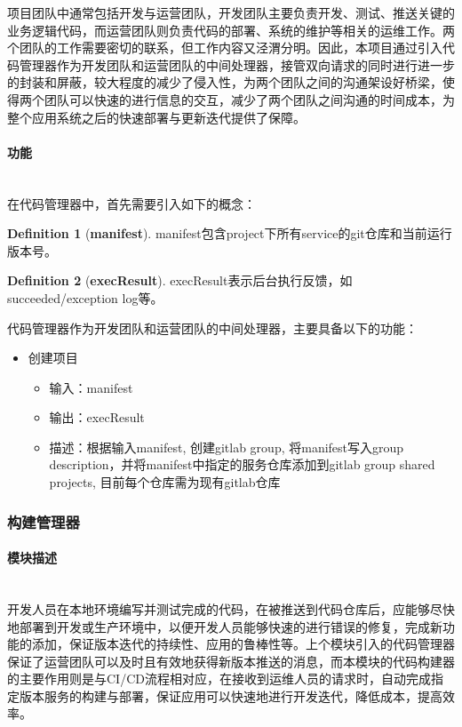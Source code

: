 \documentclass[a4paper]{article}
\theoremstyle{definition}
\newtheorem{definition}{Definition}[section]
\begin{document}
项目团队中通常包括开发与运营团队，开发团队主要负责开发、测试、推送关键的业务逻辑代码，而运营团队则负责代码的部署、系统的维护等相关的运维工作。两个团队的工作需要密切的联系，但工作内容又泾渭分明。因此，本项目通过引入代码管理器作为开发团队和运营团队的中间处理器，接管双向请求的同时进行进一步的封装和屏蔽，较大程度的减少了侵入性，为两个团队之间的沟通架设好桥梁，使得两个团队可以快速的进行信息的交互，减少了两个团队之间沟通的时间成本，为整个应用系统之后的快速部署与更新迭代提供了保障。

\paragraph{功能}\mbox{}\\

在代码管理器中，首先需要引入如下的概念：
\theoremstyle{definition}
\begin{definition}[\textbf{manifest}]
\label{definition:manifest}
manifest包含project下所有service的git仓库和当前运行版本号。
\end{definition}

\theoremstyle{definition}
\begin{definition}[\textbf{execResult}]
\label{definition:execResult}
execResult表示后台执行反馈，如succeeded/exception log等。
\end{definition}
代码管理器作为开发团队和运营团队的中间处理器，主要具备以下的功能：
\begin{itemize}
	\item{创建项目
		\begin{itemize}
		\item 输入：manifest
		\item 输出：execResult
		\item 描述：根据输入manifest, 创建gitlab group, 将manifest写入group description，并将manifest中指定的服务仓库添加到gitlab group shared projects, 目前每个仓库需为现有gitlab仓库
		\end{itemize}
	}
\end{itemize}

\subsubsection{构建管理器}
\paragraph{模块描述}\mbox{}\\

开发人员在本地环境编写并测试完成的代码，在被推送到代码仓库后，应能够尽快地部署到开发或生产环境中，以便开发人员能够快速的进行错误的修复，完成新功能的添加，保证版本迭代的持续性、应用的鲁棒性等。上个模块引入的代码管理器保证了运营团队可以及时且有效地获得新版本推送的消息，而本模块的代码构建器的主要作用则是与CI/CD流程相对应，在接收到运维人员的请求时，自动完成指定版本服务的构建与部署，保证应用可以快速地进行开发迭代，降低成本，提高效率。
\end{document}
